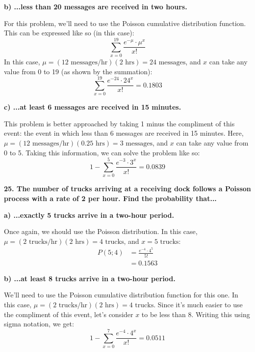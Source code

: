 \documentclass[12pt, letter]{article}
\begin{document}
\qquad \textbf{b) ...less than 20 messages are received in two hours.}
\begin{center}
	For this problem, we'll need to use the Poisson cumulative distribution function. This can be expressed like so (in this case):
	$$\sum_{x=0}^{19} \frac{e^{-\mu} \cdot \mu^{x}}{x!}$$
	In this case, $\mu = (\text{12 messages/hr})(\text{2 hrs}) = \text{24 messages}$, and $x$ can take any value from 0 to 19 (as shown by the summation):
	$$\sum_{x=0}^{19} \frac{e^{-24} \cdot 24^{x}}{x!} = \boxed{0.1803}$$
\end{center}

\pagebreak

\qquad \textbf{c) ...at least 6 messages are received in 15 minutes.}
\begin{center}
	This problem is better approached by taking 1 minus the compliment of this event: the event in which less than 6 messages are received in 15 minutes. Here, $\mu = (\text{12 messages/hr})(0.25\text{ hrs}) = \text{3 messages}$, and $x$ can take any value from 0 to 5. Taking this information, we can solve the problem like so:
	$$1-\sum_{x=0}^{5} \frac{e^{-3} \cdot 3^{x}}{x!} = \boxed{0.0839}$$
\end{center}

\textbf{25. The number of trucks arriving at a receiving dock follows a Poisson process with a rate of 2 per hour. Find the probability that...}

\qquad \textbf{a) ...exactly 5 trucks arrive in a two-hour period.}
\begin{center}
	Once again, we should use the Poisson distribution. In this case, $\mu = (\text{2 trucks/hr})(\text{2 hrs}) = \text{4 trucks}$, and $x=\text{5 trucks}$:
	\begin{align*}
		P(5;4) &= \frac{e^{-4} \cdot 4^{5}}{5!} \\
		&= \boxed{0.1563}
	\end{align*}
\end{center}

\qquad \textbf{b) ...at least 8 trucks arrive in a two-hour period.}
\begin{center}
	We'll need to use the Poisson cumulative distribution function for this one. In this case, $\mu = (\text{2 trucks/hr})(\text{2 hrs}) = \text{4 trucks}$. Since it's much easier to use the compliment of this event, let's consider $x$ to be less than 8. Writing this using sigma notation, we get:
	$$1-\sum_{x=0}^{7} \frac{e^{-4} \cdot 4^{x}}{x!}=\boxed{0.0511}$$
\end{center}
\end{document}
